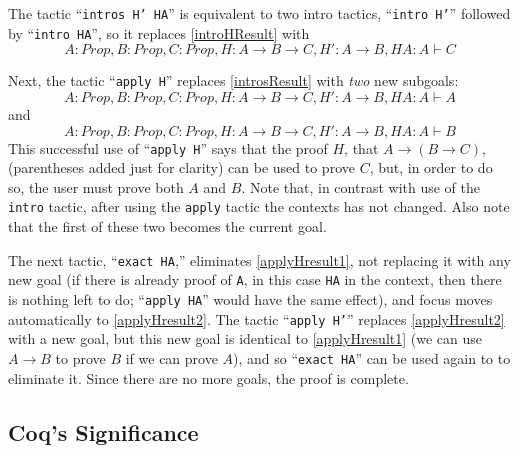\documentclass[11pt]{amsart}
\newcommand{\ra}{\ensuremath{\rightarrow}}
\begin{document}

The tactic ``\texttt{intros H' HA}'' is equivalent to two intro tactics, ``\texttt{intro H'}'' followed by ``\texttt{intro HA}'', so it replaces \eqref{introHResult} with
\begin{equation}\label{introsResult}A : Prop, B : Prop, C : Prop, H : A \ra B \ra C, H' : A \ra B,  HA : A \vdash C\end{equation}

Next, the tactic ``\texttt{apply H}'' replaces \eqref{introsResult} with \textit{two} new subgoals:
\begin{equation}\label{applyHresult1}A : Prop, B : Prop, C : Prop, H : A \ra B \ra C, H' : A \ra B,  HA : A \vdash A\end{equation}
and
\begin{equation}\label{applyHresult2}A : Prop, B : Prop, C : Prop, H : A \ra B \ra C, H' : A \ra B,  HA : A \vdash B\end{equation}
This successful use of ``\texttt{apply H}'' says that the proof $H$, that $A \ra (B \ra C)$, (parentheses added just for clarity) can be used to prove $C$, but, in order to do so, the user must prove both $A$ and $B$.  Note that, in contrast with use of the \texttt{intro} tactic, after using the \texttt{apply} tactic the contexts has not changed.  Also note that the first of these two becomes the current goal.

The next tactic, ``\texttt{exact HA},'' eliminates \eqref{applyHresult1}, not replacing it with any new goal (if there is already proof of \texttt{A}, in this case \texttt{HA} in the context, then there is nothing left to do;  ``\texttt{apply HA}'' would have the same effect), and focus moves automatically to \eqref{applyHresult2}.  The tactic ``\texttt{apply H'}'' replaces \eqref{applyHresult2} with a new goal, but this new goal is identical to \eqref{applyHresult1} (we can use $A \ra B$ to prove $B$ if we can prove $A$), and so ``\texttt{exact HA}'' can be used again to to eliminate it.  Since there are no more goals, the proof is complete.

\subsection{Coq's Significance}
\end{document}
